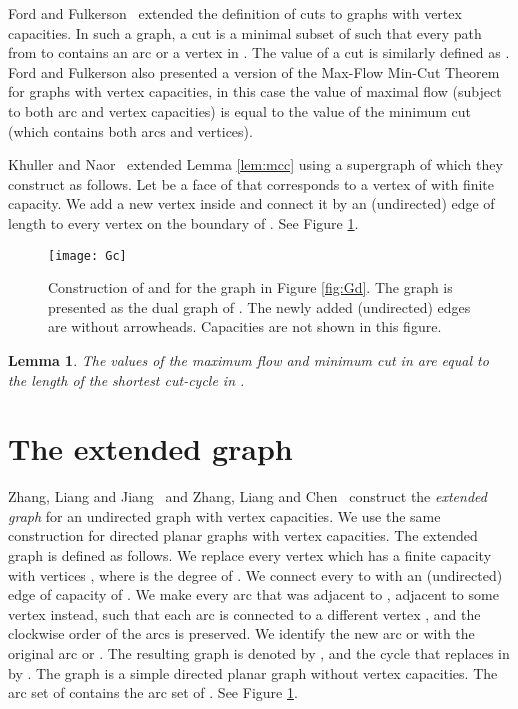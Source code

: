 \documentclass[a4paper,11pt]{article}
\newtheorem{lemma}[theorem]{Lemma}
\begin{document}
Ford and Fulkerson~\cite[Chapter I.11]{FF62} extended the definition of cuts to graphs
with vertex capacities. In such a graph, a cut  is a minimal subset
of  such that every path from  to  contains an arc or
a vertex in . The value of a cut  is similarly defined as
. Ford and Fulkerson also presented a version of the Max-Flow Min-Cut Theorem
for graphs with vertex capacities, in this case the value of maximal flow (subject to both arc and
vertex capacities) is equal to the value of the minimum cut (which contains both arcs and vertices).

Khuller and Naor~\cite{KN94} extended Lemma \ref{lem:mcc}
using a supergraph  of 
which they construct as follows.
Let  be a face of  that corresponds to a vertex  of  with finite
capacity. We add
 a new vertex  inside 
 and connect it by an (undirected) edge of length 
 to every vertex on the boundary of . See Figure \ref{fig:Gc}.

\begin{figure}
    \centering
    \texttt{[image: Gc]}
    \caption{Construction of  and  for the graph in Figure \ref{fig:Gd}.
    The graph  is presented as the dual graph of . The newly added (undirected) edges are without arrowheads. Capacities are not shown in this figure.}
    \label{fig:Gc}
\end{figure}

\begin{lemma} \cite{KN94} \label{lem:Gc}
    The values of the maximum flow and minimum cut in  are
equal to the length of the shortest cut-cycle in .
\end {lemma}

\section{The extended graph} \label{sec:ext}

 Zhang, Liang and Jiang~\cite{ZLJ06} and Zhang, Liang and Chen~\cite{ZLC08} construct the \emph{extended graph} for an undirected graph
with vertex capacities. We use the same construction for directed
planar graphs with vertex capacities.
The extended graph is defined as follows.
We replace every vertex
 which has a
 finite capacity with  vertices , where 
is the degree of . We connect every  to  with an (undirected)
edge of capacity of .
We make every arc that was adjacent
to , adjacent to some vertex  instead, such that each arc is
connected to a different vertex , and the clockwise order of the arcs
is preserved. We identify the new arc  or  with
the original arc  or . The resulting graph is denoted
by , and the cycle that replaces  in  by .
 The graph  is a simple directed planar graph
without vertex  capacities.
The arc set of  contains the arc set of .
See Figure \ref{fig:Gc}.
\end{document}

